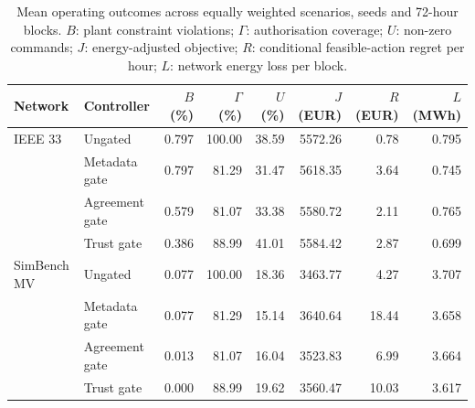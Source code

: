 \documentclass[11pt,a4paper]{article}
\begin{document}
\begin{table}[t]
\centering\small
\caption{Mean operating outcomes across equally weighted scenarios, seeds and 72-hour blocks. $B$: plant constraint violations; $\Gamma$: authorisation coverage; $U$: non-zero commands; $J$: energy-adjusted objective; $R$: conditional feasible-action regret per hour; $L$: network energy loss per block.}\label{tab:overall}
\begin{tabular}{llrrrrrr}
\toprule
Network & Controller & $B$ (\%) & $\Gamma$ (\%) & $U$ (\%) & $J$ (EUR) & $R$ (EUR) & $L$ (MWh)\\\midrule
IEEE 33 & Ungated & 0.797 & 100.00 & 38.59 & 5572.26 & 0.78 & 0.795 \\
 & Metadata gate & 0.797 & 81.29 & 31.47 & 5618.35 & 3.64 & 0.745 \\
 & Agreement gate & 0.579 & 81.07 & 33.38 & 5580.72 & 2.11 & 0.765 \\
 & Trust gate & 0.386 & 88.99 & 41.01 & 5584.42 & 2.87 & 0.699 \\
\addlinespace
SimBench MV & Ungated & 0.077 & 100.00 & 18.36 & 3463.77 & 4.27 & 3.707 \\
 & Metadata gate & 0.077 & 81.29 & 15.14 & 3640.64 & 18.44 & 3.658 \\
 & Agreement gate & 0.013 & 81.07 & 16.04 & 3523.83 & 6.99 & 3.664 \\
 & Trust gate & 0.000 & 88.99 & 19.62 & 3560.47 & 10.03 & 3.617 \\
\bottomrule\end{tabular}\end{table}
\end{document}

